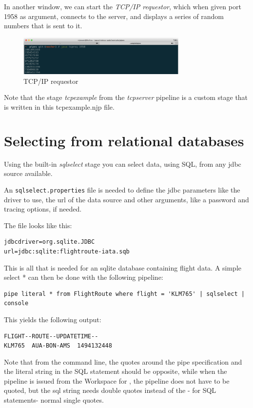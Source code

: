 In another window, we can start the \emph{TCP/IP requestor}, which
when given port 1958 as argument, connects to the server, and displays
a series of random numbers that is sent to it.

\begin{figure}[h]
  \includegraphics[width=0.75\textwidth]{images/tcpreq}
  \caption{TCP/IP requestor}
  \label{fig:tcpcompile}
\end{figure}

Note that the stage \emph{tcpexample} from the \emph{tcpserver}
pipeline is a custom stage that is written in this tcpexample.njp
file.
\section{Selecting from relational databases}

Using the built-in \emph{sqlselect} stage you can select data, using
SQL, from any jdbc source available.

An \texttt{sqlselect.properties} file is needed to define the jdbc parameters
like the driver to use, the url of the data source and other
arguments, like a password and tracing options, if needed.

The file looks like this:
\begin{lstlisting}
jdbcdriver=org.sqlite.JDBC
url=jdbc:sqlite:flightroute-iata.sqb
\end{lstlisting}

This is all that is needed for an sqlite database containing flight
data. A simple select * can then be done with the following pipeline:

\begin{lstlisting}
pipe literal * from FlightRoute where flight = 'KLM765' | sqlselect | console
\end{lstlisting}

This yields the following output:
\begin{lstlisting}
FLIGHT--ROUTE--UPDATETIME--
KLM765  AUA-BON-AMS  1494132448
\end{lstlisting}

\begin{shaded}
Note that from the command line, the quotes around the pipe
specification and the literal string in the SQL statement should be
opposite, while when the pipeline is issued from the Workspace for
\nr{}, the pipeline does not have to be quoted, but the sql string
needs double quotes instead of the - for SQL statements- normal single quotes.
\end{shaded}
